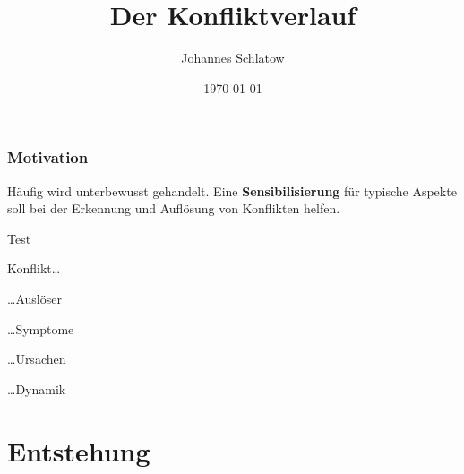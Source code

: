 \documentclass[
	ngerman,
	xcolor=dvipsnames,
	11pt
	]{beamer}
\title[ShortTitle]{Der Konfliktverlauf}
\author{Johannes Schlatow}
\institute{}
\date{\today}
\newenvironment{annot}{\begin{block}{}}{\end{block}}
\begin{document}
\begin{frame}[t,plain]
	\titlepage
\end{frame}

\begin{frame}
	\frametitle{Motivation}
\begin{annot}
	\textrm{Häufig} wird unterbewusst gehandelt. Eine \textbf{Sensibilisierung} für typische Aspekte soll bei der Erkennung und Auflösung von Konflikten helfen.	
\end{annot}
\begin{theorem}
	Test
\end{theorem}

Konflikt\ldots
\begin{description}
	\item \ldots Auslöser
	\item \ldots Symptome
	\item \ldots Ursachen
	\item \ldots Dynamik
\end{description}
\end{frame}

\section{Entstehung}
\end{document}
